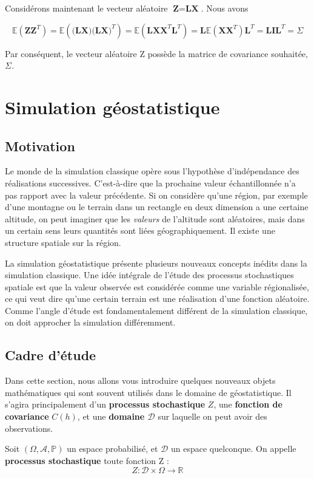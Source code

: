 \documentclass[10pt]{article} %
\begin{document}
Considérons maintenant le vecteur aléatoire $\textbf{Z} = \textbf{LX}$. Nous avons

 $$ \mathbb{E}(\textbf{ZZ}^T) = \mathbb{E}(\textbf{(LX)(LX)}^T) = \mathbb{E}(\textbf{LXX}^{T}\textbf{L}^{T}) =
 \textbf{L}\mathbb{E}(\textbf{XX}^{T})\textbf{L}^{T} = \textbf{LIL}^{T} = \Sigma $$

Par conséquent, le vecteur aléatoire Z possède la matrice de covariance souhaitée, $ \Sigma $.


\section{Simulation géostatistique}

\subsection{Motivation}

Le monde de la simulation classique opère sous l'hypothèse d'indépendance des réalisations successives. C'est-à-dire que la prochaine
valeur échantillonnée n'a pas rapport avec la valeur précédente. Si on considère qu'une région, par exemple d'une montagne ou le terrain
dans un rectangle en deux dimension a une certaine altitude, on peut imaginer que les \textit{valeurs} de l'altitude sont aléatoires, mais dans un
certain sens leurs quantités sont liées géographiquement. Il existe une structure spatiale sur la région.

La simulation géostatistique présente plusieurs nouveaux concepts inédits dans la simulation classique. Une idée intégrale de l'étude des processus
stochastiques spatiale est que la valeur observée est considérée comme une variable régionalisée, ce qui veut dire qu'une certain terrain
est une réalisation d'une fonction aléatoire. Comme l'angle d'étude est fondamentalement différent de la simulation classique, on doit approcher la simulation
différemment.

\subsection{Cadre d'étude}
Dans cette section, nous allons vous introduire quelques nouveaux objets mathématiques qui sont souvent utilisés dans le domaine
de géostatistique. Il s'agira principalement d'un \textbf{processus stochastique} $Z$, une \textbf{fonction de covariance} $C(h)$, et une \textbf{domaine $\mathcal{D}$} sur laquelle
on peut avoir des observations.

\begin{definition}
    Soit $(\Omega, \mathcal{A}, \mathbb{P})$ un espace probabilisé, et $\mathcal{D}$ un espace quelconque. On appelle
    \textbf{processus stochastique} toute fonction Z :
    $$ Z : \mathcal{D} \times \Omega \to \mathbb{R} $$
\end{definition}
\end{document}
